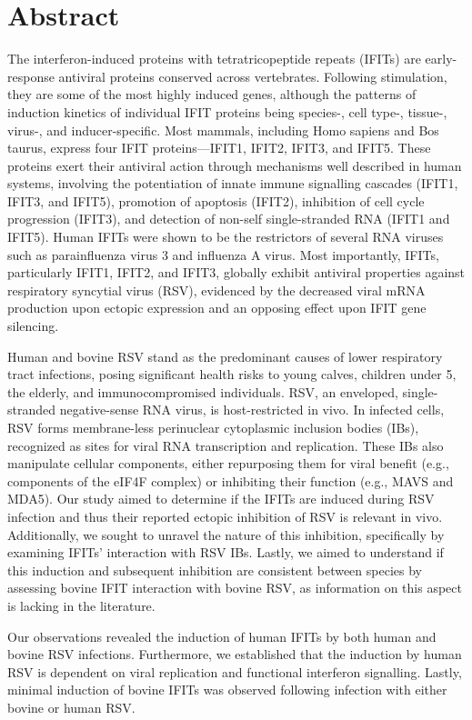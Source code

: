 \chapter{Abstract}
The interferon-induced proteins with tetratricopeptide repeats (IFITs) are early-response antiviral proteins conserved across vertebrates. Following stimulation, they are some of the most highly induced genes, although the patterns of induction kinetics of individual IFIT proteins being species-, cell type-, tissue-, virus-, and inducer-specific. Most mammals, including Homo sapiens and Bos taurus, express four IFIT proteins—IFIT1, IFIT2, IFIT3, and IFIT5. These proteins exert their antiviral action through mechanisms well described in human systems, involving the potentiation of innate immune signalling cascades (IFIT1, IFIT3, and IFIT5), promotion of apoptosis (IFIT2), inhibition of cell cycle progression (IFIT3), and detection of non-self single-stranded RNA (IFIT1 and IFIT5). Human IFITs were shown to be the restrictors of several RNA viruses such as parainfluenza virus 3 and influenza A virus. Most importantly, IFITs, particularly IFIT1, IFIT2, and IFIT3, globally exhibit antiviral properties against respiratory syncytial virus (RSV), evidenced by the decreased viral mRNA production upon ectopic expression and an opposing effect upon IFIT gene silencing.

Human and bovine RSV stand as the predominant causes of lower respiratory tract infections, posing significant health risks to young calves, children under 5, the elderly, and immunocompromised individuals. RSV, an enveloped, single-stranded negative-sense RNA virus, is host-restricted in vivo. In infected cells, RSV forms membrane-less perinuclear cytoplasmic inclusion bodies (IBs), recognized as sites for viral RNA transcription and replication. These IBs also manipulate cellular components, either repurposing them for viral benefit (e.g., components of the eIF4F complex) or inhibiting their function (e.g., MAVS and MDA5).
Our study aimed to determine if the IFITs are induced during RSV infection and thus their reported ectopic inhibition of RSV is relevant in vivo. Additionally, we sought to unravel the nature of this inhibition, specifically by examining IFITs' interaction with RSV IBs. Lastly, we aimed to understand if this induction and subsequent inhibition are consistent between species by assessing bovine IFIT interaction with bovine RSV, as information on this aspect is lacking in the literature.

Our observations revealed the induction of human IFITs by both human and bovine RSV infections. Furthermore, we established that the induction by human RSV is dependent on viral replication and functional interferon signalling. Lastly, minimal induction of bovine IFITs was observed following infection with either bovine or human RSV.

